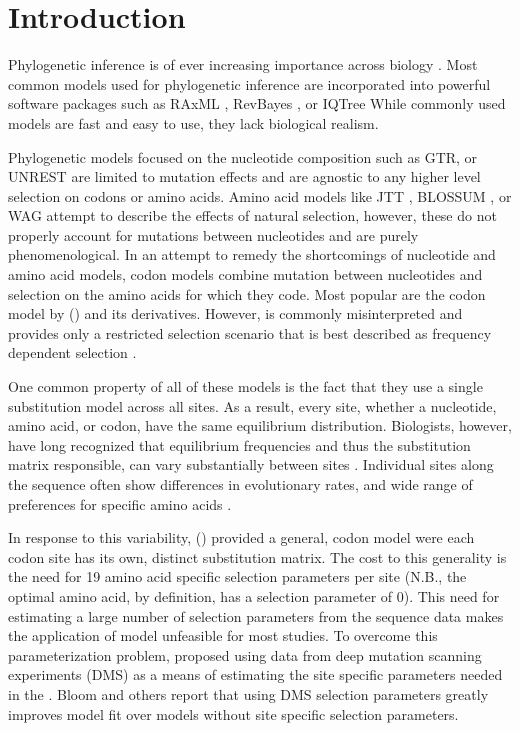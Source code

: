 \section{Introduction}

Phylogenetic inference is of ever increasing importance across biology \citep{omeara2006,YangAndBourne2009,Ruprecht2017,SchwartzAndSchaffer2017}. 
Most common models used for phylogenetic inference are incorporated into powerful software packages such as RAxML \citep{raxml}, RevBayes \citep{revbayes}, or IQTree \citep{nguyen2015}
While commonly used models are fast and easy to use, they lack biological realism.

Phylogenetic models focused on the nucleotide composition such as GTR, or UNREST \citep{Tavare1986,Yang1994} are limited to mutation effects and are agnostic to any higher level selection on codons or amino acids.
Amino acid models like JTT \citep{jones1992}, BLOSSUM \citep{blossum}, or WAG \citep{whelan2001} attempt to describe the effects of natural selection, however, these do not properly account for mutations between nucleotides and are purely phenomenological.
In an attempt to remedy the shortcomings of nucleotide and amino acid models, codon models combine mutation between nucleotides and selection on the amino acids for which they code.
Most popular are the codon model by \citet{GoldmanAndYang1994} (\gy) and its derivatives.
However, \gy is commonly misinterpreted and provides only a restricted selection scenario that is best described as frequency dependent selection \citep{HughesAndNei1988,Nowak2006,Hughes2007,beaulieu2019}.

One common property of all of these models is the fact that they use a single substitution model across all sites. As a result, every site, whether a nucleotide,  amino acid, or codon, have the same equilibrium distribution.
Biologists, however, have long recognized that equilibrium frequencies and thus the substitution matrix responsible, can vary substantially between sites \citep{felsenstein1981, gojobori1983}.
Individual sites along the sequence often show differences in evolutionary rates, and wide range of preferences for specific amino acids \citep{ashenberg2013, echave2016}.

In response to this variability, \citet{HalpernAndBruno1998} (\hb) provided a general, codon model were each codon site has its own, distinct substitution matrix.
The cost to this generality is the need for 19 amino acid specific selection parameters per site (N.B., the optimal amino acid, by definition, has a selection parameter of 0).
This need for estimating a large number of selection parameters from the sequence data makes the application of \citet{HalpernAndBruno1998} model unfeasible for most studies.
To overcome this parameterization problem,\citet{bloom2014} proposed using data from deep mutation scanning experiments (DMS) as a means of estimating the site specific parameters needed in the \citet{HalpernAndBruno1998}.
Bloom and others \citep{bloom2014, bloom2017, hilton2017} report that using DMS selection parameters greatly improves model fit over models without site specific selection parameters.

